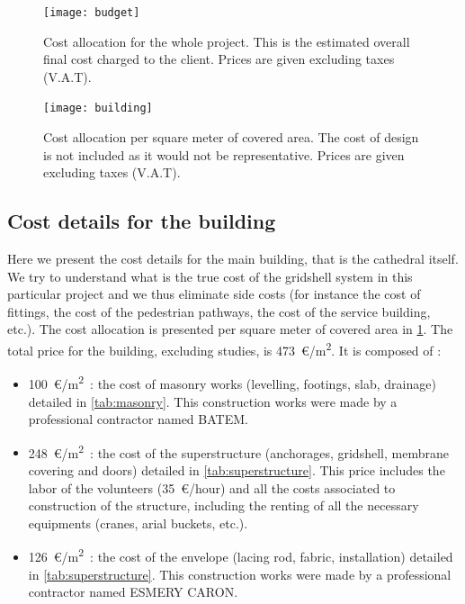\begin{figure}[h]
\begin{fullpage}
\centering
	\texttt{[image: budget]}\vspace{10pt}
	\caption[Cost allocation for the whole project]{Cost allocation for the whole project. This is the estimated overall final cost charged to the client. Prices are given excluding taxes (V.A.T).}
	\label{fig:budget}
	\vspace{2cm}
	\texttt{[image: building]}\vspace{10pt}
	\caption[Cost allocation per square meter of covered area]{Cost allocation per square meter of covered area. The cost of design is not included as it would not be representative. Prices are given excluding taxes (V.A.T).}
	\label{fig:building}
	\end{fullpage}
\end{figure}

\subsection{Cost details for the building}\label{sec=gs_cost}
Here we present the cost details for the main building, that is the cathedral itself. We try to understand what is the true cost of the gridshell system in this particular project and we thus eliminate side costs (for instance the cost of fittings, the cost of the pedestrian pathways, the cost of the service building, etc.). The cost allocation is presented per square meter of covered area in \cref{fig:building}. The total price for the building, excluding studies, is 473~€/m\textsuperscript{2}. It is composed of :
\begin{itemize}
\item  100~€/m\textsuperscript{2}~: the cost of masonry works (levelling, footings, slab, drainage) detailed in \cref{tab:masonry}. This construction works were made by a professional contractor named BATEM.
\item  248~€/m\textsuperscript{2}~: the cost of the superstructure (anchorages, gridshell, membrane covering and doors) detailed in \cref{tab:superstructure}. This price includes the labor of the volunteers (35~€/hour) and all the costs associated to construction of the structure, including the renting of all the necessary equipments (cranes, arial buckets, etc.).
\item  126~€/m\textsuperscript{2}~: the cost of the envelope (lacing rod, fabric, installation) detailed in \cref{tab:superstructure}. This construction works were made by a professional contractor named ESMERY CARON.
\end{itemize}

